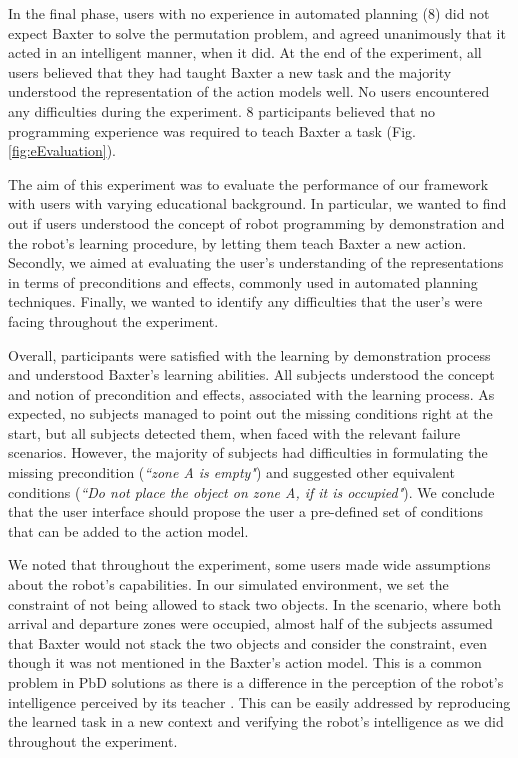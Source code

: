 In the final phase, users with no experience in automated planning (8) did not expect Baxter to solve the permutation problem, and agreed unanimously that it acted in an intelligent manner, when it did. At the end of the experiment, all users believed that they had taught Baxter a new task and the majority understood the representation of the action models well. No users encountered any difficulties during the experiment. 8 participants believed that no programming experience was required to teach Baxter a task (Fig. \ref{fig:eEvaluation}).


The aim of this experiment was to evaluate the performance of our framework with users with varying educational background. In particular, we wanted to find out if users understood the concept of robot programming by demonstration and the robot's learning procedure, by letting them teach Baxter a new action. Secondly, we aimed at evaluating the user's understanding of the representations in terms of preconditions and effects, commonly used in automated planning techniques. Finally, we wanted to identify any difficulties that the user's were facing throughout the experiment.

Overall, participants were satisfied with the learning by demonstration process and understood Baxter's learning abilities. All subjects understood the concept and notion of precondition and effects, associated with the learning process. As expected, no subjects managed to point out the missing conditions right at the start, but all subjects detected them, when faced with the relevant failure scenarios. However, the majority of subjects had difficulties in formulating the missing precondition (\textit{``zone A is empty"}) and suggested other equivalent conditions (\textit{``Do not place the object on zone A, if it is occupied"}). We conclude that the user interface should propose the user a pre-defined set of conditions that can be added to the action model.

We noted that throughout the experiment, some users made wide assumptions about the robot's capabilities. In our simulated environment, we set the constraint of not being allowed to stack two objects. In the scenario, where both arrival and departure zones were occupied, almost half of the subjects assumed that Baxter would not stack the two objects and consider the constraint, even though it was not mentioned in the Baxter's action model.
This is a common problem in PbD solutions as there is a difference in the perception of the robot's intelligence perceived by its teacher \cite{suay2012practical}. This can be easily addressed by reproducing the learned task in a new context and verifying the robot's intelligence as we did throughout the experiment.

